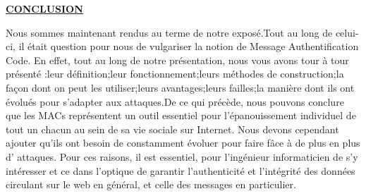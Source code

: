 \begin{center}\textbf{\underline{CONCLUSION}}
\end{center}

Nous sommes maintenant rendus au terme de notre 
exposé.Tout au long de celui-ci, il était question pour nous de vulgariser la notion de Message Authentification Code. En effet, tout au long de notre présentation, nous vous avons tour à tour présenté :leur définition;leur fonctionnement;leurs méthodes de construction;la façon dont on peut les utiliser;leurs avantages;leurs failles;la manière dont ils ont évolués pour s'adapter aux attaques.De ce qui précède, nous pouvons conclure que les MACs représentent un outil essentiel pour l'épanouissement individuel de tout un chacun au sein de sa vie sociale sur Internet. Nous devons cependant ajouter qu'ils ont besoin de constamment évoluer pour faire fâce à de plus en plus d' attaques. Pour ces raisons, il est essentiel, pour l'ingénieur informaticien de s'y intéresser et ce dans l'optique de garantir l'authenticité et l'intégrité des données circulant sur le web en général, et celle des messages en particulier.\\
\\